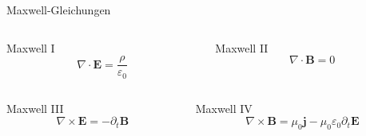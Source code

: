 \documentclass{beamer}
\begin{document}
\begin{frame}{Maxwell-Gleichungen}
  \begin{columns}[t, onlytextwidth]
    \begin{column}{0.45\textwidth}
      \begin{block}{Maxwell I}
        \begin{equation}
          \nabla \cdot \symbf{E} = \frac{ρ}{ε_0}
        \end{equation}
      \end{block}
    \end{column}
    \begin{column}{0.45\textwidth}
      \begin{block}{Maxwell II}
        \begin{equation}
          \nabla \cdot \symbf{B} = 0
        \end{equation}
      \end{block}
    \end{column}
  \end{columns}
  \begin{columns}[t, onlytextwidth]
    \begin{column}{0.45\textwidth}
      \begin{block}{Maxwell III}
        \begin{equation}
          \nabla \times \symbf{E} = - \partial_t \symbf{B}
        \end{equation}
      \end{block}
    \end{column}
    \begin{column}{0.45\textwidth}
      \begin{block}{Maxwell IV}
        \setlength{\abovedisplayskip}{0pt}
        \begin{equation}
          \nabla \times \symbf{B} = μ_0 \symbf{j} - μ_0 ε_0 \partial_t \symbf{E}
        \end{equation}
      \end{block}
    \end{column}
  \end{columns}
\end{frame}
\end{document}

